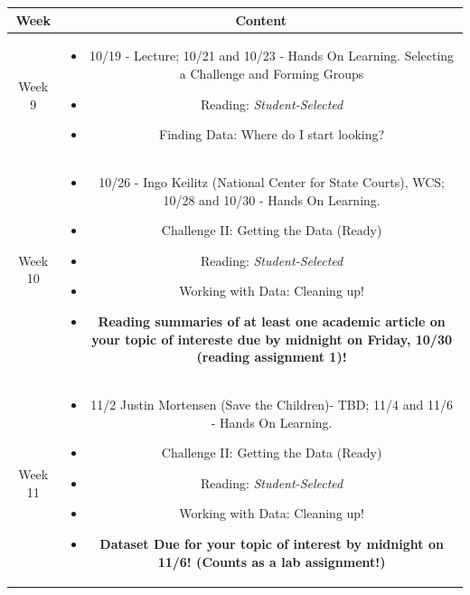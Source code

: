 \documentclass[11pt]{article}
\begin{document}
\begin{table}[h!]
\small %
\begin{tabular}{ | c | c | }
\hline
\textbf{Week} & \textbf{Content} \\
\hline

Week 9 & \begin{minipage}{.85\textwidth}
\begin{itemize} \itemsep-0.4em
	\vspace{1mm}
	\item 10/19 - Lecture; 10/21 and 10/23 - Hands On Learning.
	Selecting a Challenge and Forming Groups
	\item Reading: \textit{Student-Selected}
	\item Finding Data: Where do I start looking?
	\vspace{1mm}
\end{itemize}
\end{minipage} \\
\hline

Week 10 & \begin{minipage}{.85\textwidth}
\begin{itemize} \itemsep-0.4em
	\vspace{1mm}
	\item 10/26 - Ingo Keilitz (National Center for State Courts), WCS; 10/28 and 10/30 - Hands On Learning.
	\item Challenge II: Getting the Data (Ready)
	\item Reading: \textit{Student-Selected}
	\item Working with Data: Cleaning up!
	\item \textbf{Reading summaries of at least one academic article on your topic of intereste due by midnight on Friday, 10/30 (reading assignment 1)!}
	\vspace{1mm}
\end{itemize}
\end{minipage} \\
\hline

Week 11 & \begin{minipage}{.85\textwidth}
\begin{itemize} \itemsep-0.4em
	\vspace{1mm}
	\item 11/2 Justin Mortensen (Save the Children)- TBD; 11/4 and 11/6 - Hands On Learning.
	\item Challenge II: Getting the Data (Ready)
	\item Reading: \textit{Student-Selected}
	\item Working with Data: Cleaning up!
	\item \textbf{Dataset Due for your topic of interest by midnight on 11/6! (Counts as a lab assignment!)}
	\vspace{1mm}
\end{itemize}
\end{minipage} \\
\hline


\end{tabular}
\end{table}
\end{document}
